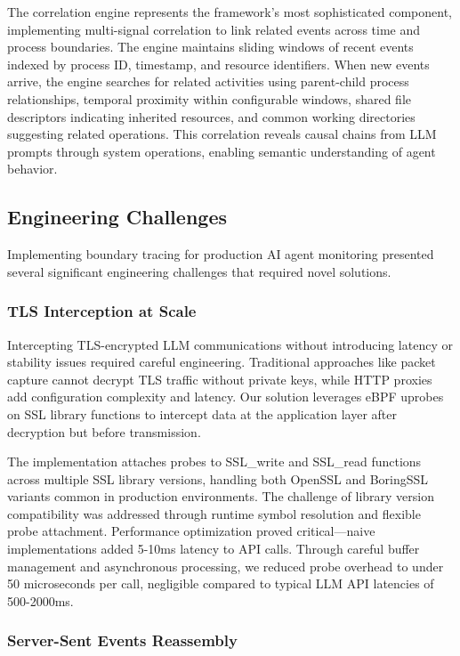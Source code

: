 The correlation engine represents the framework's most sophisticated component, implementing multi-signal correlation to link related events across time and process boundaries. The engine maintains sliding windows of recent events indexed by process ID, timestamp, and resource identifiers. When new events arrive, the engine searches for related activities using parent-child process relationships, temporal proximity within configurable windows, shared file descriptors indicating inherited resources, and common working directories suggesting related operations. This correlation reveals causal chains from LLM prompts through system operations, enabling semantic understanding of agent behavior.

\subsection{Engineering Challenges}

Implementing boundary tracing for production AI agent monitoring presented several significant engineering challenges that required novel solutions.

\subsubsection{TLS Interception at Scale}

Intercepting TLS-encrypted LLM communications without introducing latency or stability issues required careful engineering. Traditional approaches like packet capture cannot decrypt TLS traffic without private keys, while HTTP proxies add configuration complexity and latency. Our solution leverages eBPF uprobes on SSL library functions to intercept data at the application layer after decryption but before transmission.

The implementation attaches probes to SSL\_write and SSL\_read functions across multiple SSL library versions, handling both OpenSSL and BoringSSL variants common in production environments. The challenge of library version compatibility was addressed through runtime symbol resolution and flexible probe attachment. Performance optimization proved critical—naive implementations added 5-10ms latency to API calls. Through careful buffer management and asynchronous processing, we reduced probe overhead to under 50 microseconds per call, negligible compared to typical LLM API latencies of 500-2000ms.

\subsubsection{Server-Sent Events Reassembly}

